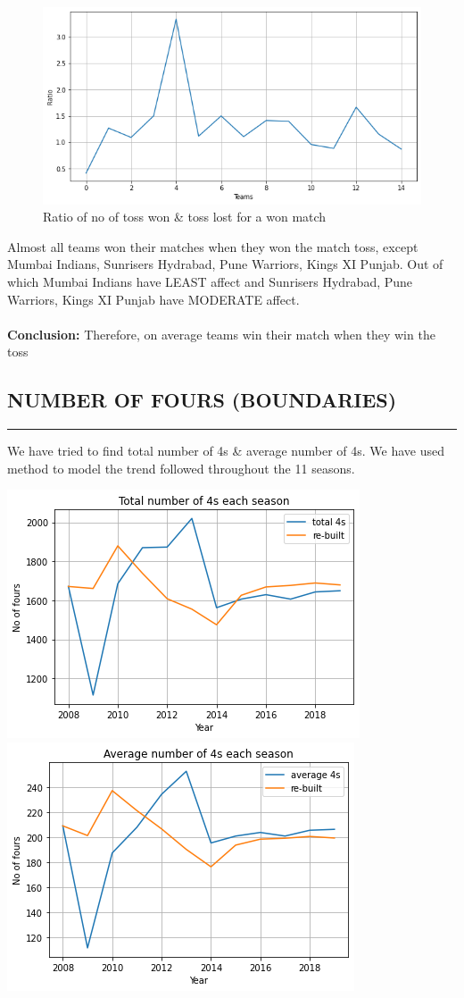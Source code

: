 \documentclass[12pt]{article}
\newcommand{\codebox}[1]{%
	\colorbox{codecolor}{\ttfamily \detokenize{#1}}%
}
\begin{document}
\begin{figure}
	\centering
	\includegraphics[width=0.7\linewidth]{toss}
	\caption{Ratio of no of toss won \& toss lost for a won match}
	\label{fig:toss}
\end{figure}

Almost all teams won their matches when they won the match toss, except Mumbai Indians, Sunrisers Hydrabad, Pune Warriors, Kings XI Punjab. Out of which Mumbai Indians have LEAST affect and Sunrisers Hydrabad, Pune Warriors, Kings XI Punjab have MODERATE affect.\\\\
\textbf{Conclusion:} Therefore, on average teams win their match when they win the toss

\subsection*{NUMBER OF FOURS (BOUNDARIES)}
\hrule
\vspace*{15pt}

We have tried to find total number of 4s \& average number of 4s. We have used \codebox{moving average} method to model the trend followed throughout the 11 seasons.

{\centering\includegraphics[width=0.5\linewidth]{foursT}\includegraphics[width=0.5\linewidth]{foursA}}
\end{document}
